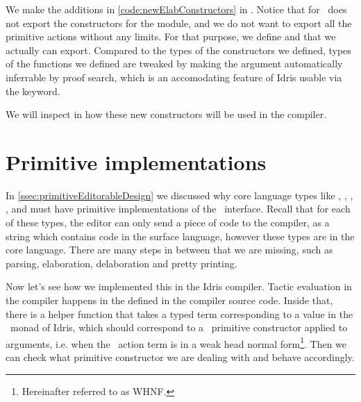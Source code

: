 We make the additions in \autoref{code:newElabConstructors} in \LRE.  Notice
that  for \Elab\ does not export the constructors for the module,
and we do not want to export all the primitive actions without any limits. For
that purpose, we define  and  that
we actually can export. Compared to the types of the constructors we defined,
types of the functions we defined are tweaked by making the 
argument automatically inferrable by proof search, which is
an accomodating feature of Idris usable via the  keyword.

We will inspect in \label{sec:primitiveEditorableImpl} how these new
constructors will be used in the compiler.

\section{Primitive  implementations}\label{sec:primitiveEditorableImpl}

In \autoref{ssec:primitiveEditorableDesign} we discussed why core language
types like , , , , and
 must have primitive implementations of the
\Editorable\ interface. Recall that for each of these types, the editor can
only send a piece of code to the compiler, as a string which contains code in
the surface language, however these types are in the core language. There are
many steps in between that we are missing, such as parsing, elaboration,
delaboration and pretty printing.

Now let's see how we implemented this in the Idris compiler. Tactic evaluation
in the compiler happens in the  defined in the compiler
source code. Inside that, there is a helper function  that takes a
typed term corresponding to a value in the \Elab\ monad of Idris, which should
correspond to a \Elab\ primitive constructor applied to arguments, i.e. when
the \Elab\ action term is in a weak head normal form\footnote{Hereinafter referred
to as WHNF.}. Then we can check what primitive constructor we are dealing with
and behave accordingly.


